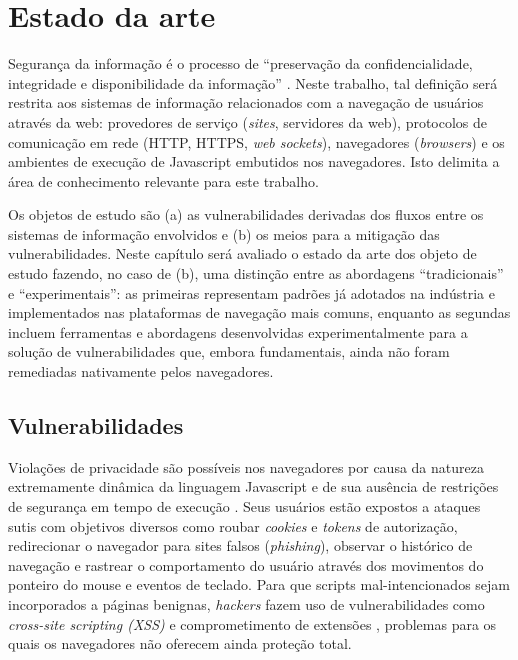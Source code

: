 \section{Estado da arte}
Segurança da informação é o processo de ``preservação da confidencialidade, integridade e disponibilidade da informação'' \cite{ISO2016}. Neste trabalho, tal definição será restrita aos sistemas de informação relacionados com a navegação de usuários através da web: provedores de serviço (\textit{sites}, servidores da web), protocolos de comunicação em rede (HTTP, HTTPS, \textit{web sockets}), navegadores (\textit{browsers}) e os ambientes de execução de Javascript embutidos nos navegadores. Isto delimita a área de conhecimento relevante para este trabalho.

Os objetos de estudo são (a) as vulnerabilidades derivadas dos fluxos \cite{Goguen1982} \cite{Denning1976} entre os sistemas de informação envolvidos e (b) os meios para a mitigação das vulnerabilidades. Neste capítulo será avaliado o estado da arte dos objeto de estudo fazendo, no caso de (b), uma distinção entre as abordagens ``tradicionais'' e ``experimentais'': as primeiras representam padrões já adotados na indústria e implementados nas plataformas de navegação mais comuns, enquanto as segundas incluem ferramentas e abordagens desenvolvidas experimentalmente para a solução de vulnerabilidades que, embora fundamentais, ainda não foram remediadas nativamente pelos navegadores.


\subsection{Vulnerabilidades}

Violações de privacidade são possíveis nos navegadores por causa da natureza extremamente dinâmica da linguagem Javascript e de sua ausência de restrições de segurança em tempo de execução \cite{Jang2010}. Seus usuários estão expostos a ataques sutis com objetivos diversos como roubar \textit{cookies} e \textit{tokens} de autorização, redirecionar o navegador para sites falsos (\textit{phishing}), observar o histórico de navegação e rastrear o comportamento do usuário através dos movimentos do ponteiro do mouse e eventos de teclado. Para que scripts mal-intencionados sejam incorporados a páginas benignas, \textit{hackers} fazem uso de vulnerabilidades como \textit{cross-site scripting (XSS)} \cite{OWASP:XSS} e comprometimento de extensões \cite{Heule2015}, problemas para os quais os navegadores não oferecem ainda proteção total.

